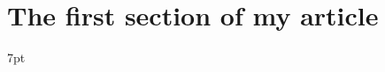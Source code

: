 \documentclass{article}
\newenvironment{formal}{%
\def\FrameCommand{%
\hspace{1pt}%
{\color{DarkBlue}\vrule width 2pt}%
{\color{formalshade}\vrule width 4pt}%
\colorbox{formalshade}%
}%
\MakeFramed{\advance\hsize-\width\FrameRestore}%
\noindent\hspace{-4.55pt}%
\begin{adjustwidth}{}{7pt}%
\vspace{2pt}\vspace{2pt}%
}
{%
\vspace{2pt}\end{adjustwidth}\endMakeFramed%
}
\begin{document}
\section{The first section of my article}
\begin{formal}
\lipsum[4]
\end{formal}
\end{document}

